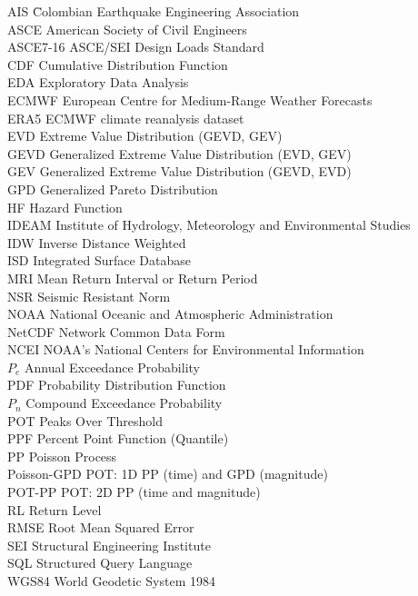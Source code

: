\documentclass[12pt,twoside]{reedthesis}
\begin{document}
  \begin{dedication}
    \begin{tabbing}
    AIS \hspace{4em} \= Colombian Earthquake Engineering Association  \\
    ASCE \> American Society of Civil Engineers \\
    ASCE7-16 \> ASCE/SEI Design Loads Standard \\
    CDF \>  Cumulative Distribution Function \\
    EDA \>  Exploratory Data Analysis \\
    ECMWF \>  European Centre for Medium-Range Weather Forecasts \\
    ERA5 \>  ECMWF climate reanalysis dataset  \\
    EVD \>  Extreme Value Distribution (GEVD, GEV)  \\
    GEVD \>  Generalized Extreme Value Distribution (EVD, GEV) \\
    GEV \>  Generalized Extreme Value Distribution (GEVD, EVD)  \\
    GPD \>  Generalized Pareto Distribution  \\
    HF \> Hazard Function \\
    IDEAM \> Institute of Hydrology, Meteorology and Environmental Studies \\
    IDW \>  Inverse Distance Weighted \\
    ISD \> Integrated Surface Database \\
    MRI \> Mean Return Interval or Return Period \\
    NSR \> Seismic Resistant Norm  \\
    NOAA \> National Oceanic and Atmospheric Administration \\
    NetCDF \> Network Common Data Form \\
    NCEI \> NOAA's National Centers for Environmental Information \\
    $P_e$ \> Annual Exceedance Probability \\
    PDF \> Probability Distribution Function  \\
    $P_n$ \>  Compound Exceedance Probability \\
    POT \> Peaks Over Threshold \\
    PPF \> Percent Point Function (Quantile) \\
    PP \> Poisson Process \\
    Poisson-GPD \> POT: 1D PP (time) and GPD (magnitude) \\
    POT-PP  \> POT: 2D PP (time and magnitude) \\
    RL \> Return Level \\
    RMSE \> Root Mean Squared Error \\  
    SEI \> Structural Engineering Institute \\
    SQL \>  Structured Query Language \\
    WGS84 \> World Geodetic System 1984
    \end{tabbing}
  \end{dedication}
\mainmatter %
\pagestyle{fancyplain} %
\end{document}
